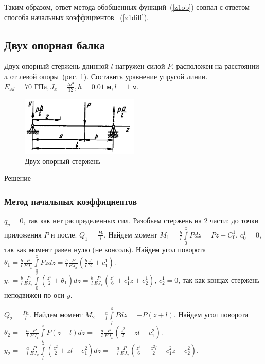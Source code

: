 \documentclass[12pt, a4paper]{article}
\begin{document}
Таким образом, ответ метода обобщенных функций~(\ref{z1ob}) совпал с ответом способа начальных коэффициентов ~(\ref{z1diff}).
\subsection{Двух опорная балка}
Двух опорный стержень длинной $l$ нагружен силой $P$, расположен на расстоянии a от левой опоры~(рис. \ref{pic8}). Составить уравнение упругой линии.  $E_{Al} = 70 \mbox{ ГПа}, J_{x} = \frac{l h^3}{12}, h = 0.01 \mbox{ м}, l = 1 \mbox{ м}$.

\begin{figure}[!h]
	\centering
	\includegraphics[width=0.5\textwidth]{pic.8}%
	\caption{Двух опорный стержень}
	\vspace*{-2mm}
	\label{pic8}
\end{figure}

\begin{center}Решение\end{center}

\subsubsection{Метод начальных коэффициентов}

$q_{y} =  0$, так как нет распределенных сил. Разобьем стержень на 2 части: до точки приложения $P$ и после. $Q_1 = \frac{P b}{l} $. Найдем момент $M_1 = \frac{b}{l} \int\limits_0^z P d z = P z + C_0^1$, $c_0^1 = 0$, так как момент равен нулю (не консоль).
Найдем угол поворота $\theta_1 = \frac{b}{l} \frac{P}{E J_{x}} \int\limits_0^z P z d z = \frac{b}{l} \frac{P}{E J_{x}} (\frac{b}{l} \frac{z^2}{2} + c_1^1)$. 
$y_1 = \frac{b}{l} \frac{P}{E J_{x}} \int\limits_0^z (\frac{z^2}{2} + \theta_1) dz =  \frac{b}{l} \frac{P}{E J_{x}} (\frac{z^3}{6} + c_1^1 z + c_2^1)$, $c_2^1 = 0$, так как концах стержень неподвижен по оси $y$. 

$Q_2 = \frac{P a}{l}$. 
Найдем момент $M_2 = \frac{a}{l} \int\limits_l^z P d z = -P(z + l)$. 
Найдем угол поворота $\theta_2 = - \frac{a}{l} \frac{P}{E J_{x}} \int\limits_l^z P(z + l) d z = - \frac{a}{l} \frac{P}{E J_{x}} (\frac{z^2}{2} + z l - c_1^2)$. 
$y_2 =  - \frac{a}{l} \frac{P}{E J_{x}} \int\limits_l^z (\frac{z^2}{2} + z l - c_1^2) dz = - \frac{a}{l}  \frac{P}{E J_{x}} (\frac{z^3}{6} + \frac{z^2 l}{2} - c_1^2 z + c_2^2)$. 
\end{document}
